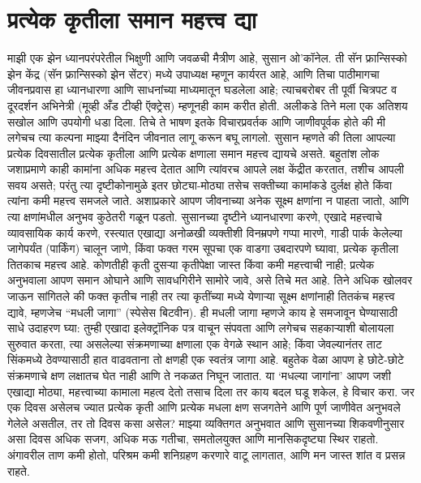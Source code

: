 \chapter{प्रत्येक कृतीला समान महत्त्व द्या}
माझी एक झेन ध्यानपरंपरेतील भिक्षुणी आणि जवळची मैत्रीण आहे, सुसान ओ’कॉनेल. ती सॅन फ्रान्सिस्को झेन केंद्र (सॅन फ्रान्सिस्को झेन सेंटर) मध्ये उपाध्यक्ष म्हणून कार्यरत आहे, आणि तिचा पाठीमागचा जीवनप्रवास हा ध्यानधारणा आणि साधनांच्या माध्यमातून घडलेला आहे; त्याचबरोबर ती पूर्वी चित्रपट व दूरदर्शन अभिनेत्री (मूव्ही अँड टीव्ही ऍक्ट्रेस) म्हणूनही काम करीत होती. अलीकडे तिने मला एक अतिशय सखोल आणि उपयोगी धडा दिला. तिचे ते भाषण इतके विचारप्रवर्तक आणि जाणीवपूर्वक होते की मी लगेचच त्या कल्पना माझ्या दैनंदिन जीवनात लागू करून बघू लागलो.
सुसान म्हणते की तिला आपल्या प्रत्येक दिवसातील प्रत्येक कृतीला आणि प्रत्येक क्षणाला समान महत्त्व द्यायचे असते. बहुतांश लोक जशाप्रमाणे काही कामांना अधिक महत्त्व देतात आणि त्यांवरच आपले लक्ष केंद्रीत करतात, तशीच आपली सवय असते; परंतु त्या दृष्टीकोनामुळे इतर छोट्या-मोठ्या तसेच सक्तीच्या कामांकडे दुर्लक्ष होते किंवा त्यांना कमी महत्त्व समजले जाते. अशाप्रकारे आपण जीवनाच्या अनेक सूक्ष्म क्षणांना न पाहता जातो, आणि त्या क्षणांमधील अनुभव कुठेतरी गळून पडतो.
सुसानच्या दृष्टीने ध्यानधारणा करणे, एखादे महत्त्वाचे व्यावसायिक कार्य करणे, रस्त्यात एखाद्या अनोळखी व्यक्तीशी विनम्रपणे गप्पा मारणे, गाडी पार्क केलेल्या जागेपर्यंत (पार्किंग) चालून जाणे, किंवा फक्त गरम सूपचा एक वाडगा उबदारपणे घ्यावा, प्रत्येक कृतीला तितकाच महत्त्व आहे. कोणतीही कृती दुसऱ्या कृतीपेक्षा जास्त किंवा कमी महत्त्वाची नाही; प्रत्येक अनुभवाला आपण समान ओघाने आणि सावधगिरीने सामोरे जावे, असे तिचे मत आहे.
तिने अधिक खोलवर जाऊन सांगितले की फक्त कृतीच नाही तर त्या कृतींच्या मध्ये येणाऱ्या सूक्ष्म क्षणांनाही तितकंच महत्त्व द्यावे, म्हणजेच “मधली जागा” (स्पेसेस बिटवीन). ही मधली जागा म्हणजे काय हे समजावून घेण्यासाठी साधे उदाहरण घ्या: तुम्ही एखादा इलेक्ट्रॉनिक पत्र वाचून संपवता आणि लगेचच सहकाऱ्याशी बोलायला सुरुवात करता, त्या असलेल्या संक्रमणाच्या क्षणाला एक वेगळे स्थान आहे; किंवा जेवल्यानंतर ताट सिंकमध्ये ठेवण्यासाठी हात वाढवताना तो क्षणही एक स्वतंत्र जागा आहे. बहुतेक वेळा आपण हे छोटे-छोटे संक्रमणाचे क्षण लक्षातच घेत नाही आणि ते नकळत निघून जातात.
या ‘मधल्या जागांना’ आपण जशी एखाद्या मोठ्या, महत्त्वाच्या कामाला महत्व देतो तसाच दिला तर काय बदल घडू शकेल, हे विचार करा. जर एक दिवस असेलच ज्यात प्रत्येक कृती आणि प्रत्येक मधला क्षण सजगतेने आणि पूर्ण जाणीवेत अनुभवले गेलेले असतील, तर तो दिवस कसा असेल? माझ्या व्यक्तिगत अनुभवात आणि सुसानच्या शिकवणीनुसार असा दिवस अधिक सजग, अधिक मऊ गतीचा, समतोलयुक्त आणि मानसिकदृष्ट्या स्थिर राहतो. अंगावरील ताण कमी होतो, परिश्रम कमी शनिग्रहण करणारे वाटू लागतात, आणि मन जास्त शांत व प्रसन्न राहते.
